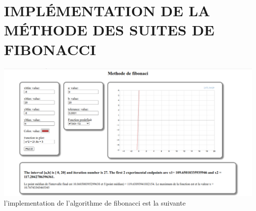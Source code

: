 \documentclass[a4paper,14pt]{article}
\begin{document}
\section{IMPLÉMENTATION DE LA MÉTHODE DES SUITES DE FIBONACCI}

\includegraphics[scale = 0.4] { c}
l'implementation de l'algorithme de fibonacci est la suivante 
\end{document}
